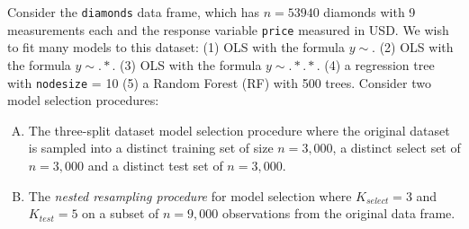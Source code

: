 \documentclass[12pt,landscape]{article}
\begin{document}
\problem{} Consider the \texttt{diamonds} data frame, which has $n = 53940$ diamonds with 9 measurements each and the response variable \texttt{price} measured in USD. We wish to fit many models to this dataset: (1) OLS with the formula $y \sim .$ (2) OLS with the formula $y \sim . * .$ (3) OLS with the formula $y \sim . * . * .$ (4) a regression tree with \texttt{nodesize} = 10 (5) a Random Forest (RF) with 500 trees. Consider two model selection procedures:
\vspace{-0.1cm}
\begin{enumerate}[A.]
\item The three-split dataset model selection procedure where the original dataset is sampled into a distinct training set of size $n=3,000$, a distinct select set of $n=3,000$ and a distinct test set of $n=3,000$.
\item The \textit{nested resampling procedure} for model selection where $K_{select} = 3$ and $K_{test} = 5$ on a subset of $n=9,000$ observations from the original data frame.
\end{enumerate}

\vspace{-0.2cm}\benum{}
\end{document}
